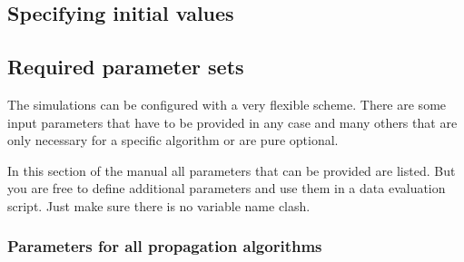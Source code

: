 \documentclass[a4paper,10pt]{report}
\begin{document}
\subsection{Specifying initial values}


\subsection{Required parameter sets}

The simulations can be configured with a very flexible scheme. There are some
input parameters that have to be provided in any case and many others that
are only necessary for a specific algorithm or are pure optional.

In this section of the manual all parameters that can be provided are listed.
But you are free to define additional parameters and use them in a data evaluation
script. Just make sure there is no variable name clash.


\subsubsection{Parameters for all propagation algorithms}
\end{document}
